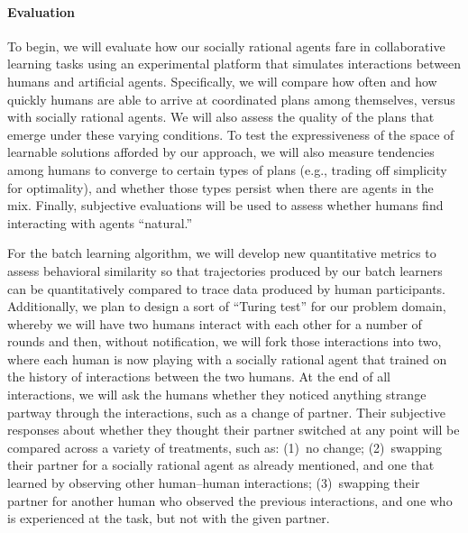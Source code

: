 
\vspace{\up}
\paragraph{Evaluation}

To begin, we will evaluate how our socially rational agents fare in
collaborative learning tasks using an experimental platform that
simulates interactions between humans and artificial agents.
Specifically, we will compare how often and how quickly humans are
able to arrive at coordinated plans among themselves, versus with
socially rational agents.  We will also assess the quality of the
plans that emerge under these varying conditions.  To test the
expressiveness of the space of learnable solutions afforded by our
approach, we will also measure tendencies among humans to converge to
certain types of plans (e.g., trading off simplicity for optimality),
and whether those types persist when there are agents in the mix.
Finally, subjective evaluations will be used to assess whether humans
find interacting with agents ``natural.''

For the batch learning algorithm, we will develop new quantitative
metrics to assess behavioral similarity so that trajectories produced
by our batch learners can be quantitatively compared to trace data
produced by human participants.  Additionally, we plan to design a
sort of ``Turing test'' for our problem domain, whereby we will have
two humans interact with each other for a number of rounds and then,
without notification, we will fork those interactions into two, where
each human is now playing with a socially rational agent that trained
on the history of interactions between the two humans.  At the end of
all interactions, we will ask the humans whether they noticed anything
strange partway through the interactions, such as a change of partner.
Their subjective responses about whether they thought their partner
switched at any point will be compared across a variety of treatments,
such as: (1)~no change; (2)~swapping their partner for a
socially rational agent as already mentioned, and one that learned by
observing other human--human interactions; (3)~swapping their partner
for another human who observed the previous interactions, and one who
is experienced at the task, but not with the given partner.

